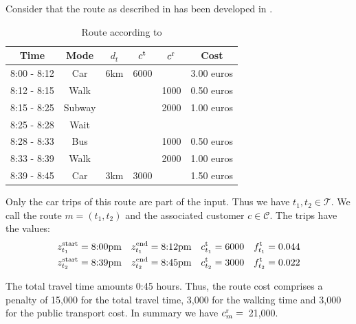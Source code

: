 \begin{example}
\label{ex:example_route}

Consider that the route as described in  has been developed in . 

\begin{table}[htb]
	\centering
	\begin{tabular}{cccccc}
		\toprule
		Time & Mode & $d_t$ & $c^{\operatorname{t}}$ & $c^{\operatorname{r}}$ & Cost \\
		\midrule
		8:00 - 8:12 & Car & 6km & 6000 & & 3.00 euros \\
		8:12 - 8:15 & Walk & & & 1000 & 0.50 euros \\
		8:15 - 8:25	& Subway & & & 2000 & 1.00 euros \\
		8:25 - 8:28 & Wait & & & & \\
		8:28 - 8:33 & Bus & & & 1000 & 0.50 euros \\
		8:33 - 8:39 & Walk & & & 2000 & 1.00 euros \\
		8:39 - 8:45 & Car & 3km & 3000 & & 1.50 euros \\
		\bottomrule
	\end{tabular}
	\caption{Route according to }
	\label{tab:exemplary_route}
\end{table}

Only the car trips of this route are part of the input. Thus we have $t_1,t_2\in\mathcal{T}$. We call the route ${m=\left(t_1,t_2\right)}$ and the associated customer $c\in\mathcal{C}$. The trips have the values:
\begin{align*}
	z^{\operatorname{start}}_{t_1} = \text{8:00pm} && z^{\operatorname{end}}_{t_1} = \text{8:12pm} && c^{\operatorname{t}}_{t_1} = 6000 && f^{\operatorname{t}}_{t_1} = 0.044 \\
	z^{\operatorname{start}}_{t_2} = \text{8:39pm} && z^{\operatorname{end}}_{t_2} = \text{8:45pm} && c^{\operatorname{t}}_{t_2} = 3000 && f^{\operatorname{t}}_{t_2} = 0.022
\end{align*}

The total travel time amounts 0:45 hours. Thus, the route cost comprises a penalty of 15,000 for the total travel time, 3,000 for the walking time and 3,000 for the public transport cost. In summary we have ${c^{\operatorname{r}}_m =}$~21,000.

\end{example}